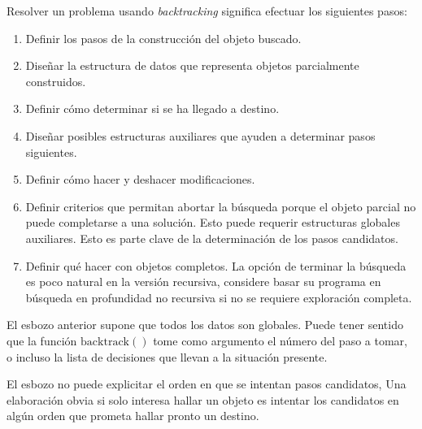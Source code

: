   Resolver un problema usando \emph{\foreignlanguage{english}{backtracking}}
  significa efectuar los siguientes pasos:
  \begin{enumerate}[font = \textbf, label = {(\alph*)}]
  \item
    Definir los pasos de la construcción del objeto buscado.
  \item
    Diseñar la estructura de datos
    que representa objetos parcialmente construidos.
  \item
    Definir cómo determinar si se ha llegado a destino.
  \item
    Diseñar posibles estructuras auxiliares
    que ayuden a determinar pasos siguientes.
  \item
    Definir cómo hacer y deshacer modificaciones.
  \item
    Definir criterios que permitan abortar la búsqueda
    porque el objeto parcial no puede completarse a una solución.
    Esto puede requerir estructuras globales auxiliares.
    Esto es parte clave de la determinación de los pasos candidatos.
  \item
    Definir qué hacer con objetos completos.
    La opción de terminar la búsqueda es poco natural
    en la versión recursiva,
    considere basar su programa en búsqueda en profundidad no recursiva
    si no se requiere exploración completa.
  \end{enumerate}
  El esbozo anterior supone que todos los datos son globales.
  Puede tener sentido que la función \(\mathrm{backtrack}()\)
  tome como argumento el número del paso a tomar,
  o incluso la lista de decisiones que llevan a la situación presente.

  El esbozo no puede explicitar el orden en que se intentan pasos candidatos,
  Una elaboración obvia si solo interesa hallar un objeto
  es intentar los candidatos
  en algún orden que prometa hallar pronto un destino.

